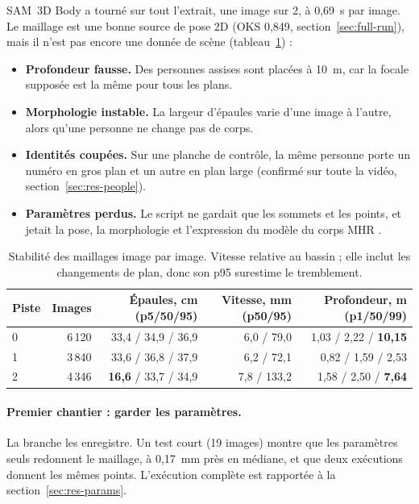 \documentclass[11pt,a4paper]{report}
\newcommand{\code}[1]{\texttt{\detokenize{#1}}}
\begin{document}
SAM~3D Body a tourné sur tout l'extrait, une image sur 2, à 0,69~s par image. Le maillage est une bonne source de pose 2D (OKS
0,849, section~\ref{sec:full-run}), mais il n'est pas encore une donnée de scène (tableau~\ref{tab:mesh-state}) :
\begin{itemize}
    \item \textbf{Profondeur fausse.} Des personnes assises sont placées à 10~m, car la focale supposée est la même pour tous les
    plans.
    \item \textbf{Morphologie instable.} La largeur d'épaules varie d'une image à l'autre, alors qu'une personne ne change pas de
    corps.
    \item \textbf{Identités coupées.} Sur une planche de contrôle, la même personne porte un numéro en gros plan et un autre en plan
    large (confirmé sur toute la vidéo, section~\ref{sec:res-people}).
    \item \textbf{Paramètres perdus.} Le script ne gardait que les sommets et les points, et jetait la pose, la morphologie et
    l'expression du modèle du corps MHR \cite{mhr2025}.
\end{itemize}

\begin{table}[H]
\centering
\caption{Stabilité des maillages image par image. Vitesse relative au bassin ; elle inclut les changements de plan, donc son p95
surestime le tremblement.}
\label{tab:mesh-state}
\footnotesize
\setlength{\tabcolsep}{4pt}
\begin{tabular}{@{}lrrrr@{}}
\toprule
Piste & Images & Épaules, cm (p5/50/95) & Vitesse, mm (p50/95) & Profondeur, m (p1/50/99) \\
\midrule
0 & 6\,120 & 33,4 / 34,9 / 36,9 & 6,0 / 79,0 & 1,03 / 2,22 / \textbf{10,15} \\
1 & 3\,840 & 33,6 / 36,8 / 37,9 & 6,2 / 72,1 & 0,82 / 1,59 / 2,53 \\
2 & 4\,346 & \textbf{16,6} / 33,7 / 34,9 & 7,8 / 133,2 & 1,58 / 2,50 / \textbf{7,64} \\
\bottomrule
\end{tabular}
\end{table}

\paragraph{Premier chantier : garder les paramètres.} La branche \code{feature/mesh-params} les enregistre. Un test court (19
images) montre que les paramètres seuls redonnent le maillage, à 0,17~mm près en médiane, et que deux exécutions donnent les mêmes
points. L'exécution complète est rapportée à la section~\ref{sec:res-params}.
\end{document}
